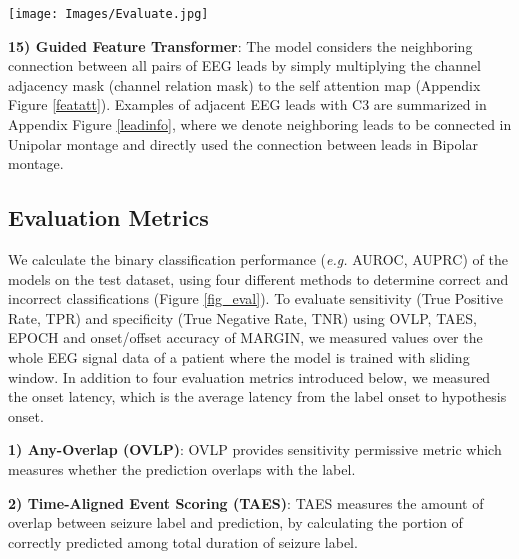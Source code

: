 \documentclass[pmlr,twocolumn,10pt]{jmlr}
\begin{document}
\begin{figure*}[h!]
	\centering
	\texttt{[image: Images/Evaluate.jpg]}
    \caption{\small \textbf{Evaluation Methods} on example raw EEG signal. OVLP, TAES, MARGIN evaluates the model on the whole raw signal. OVLP outputs whether the hypothesis overlaps with the label, and TAES outputs the duration of how much hypothesis overlaps with label. MARGIN evaluates whether the onset/offset of event hypothesis is within set margin window. EPOCH outputs evaluation on hypothesis based on each window. Then final TP is measured by counting the number of windows where the model hypothesis was correct, divided by the total number of windows within each batch. TP - True Positive; FN - False Negative.}
	\label{fig_eval}
	\vspace{-10pt}
\end{figure*} \noindent\textbf{15) Guided Feature Transformer}: The model considers the neighboring connection between all pairs of EEG leads by simply multiplying the channel adjacency mask (channel relation mask) to the self attention map (Appendix Figure \ref{featatt}).
Examples of adjacent EEG leads with C3 are summarized in Appendix Figure \ref{leadinfo}, where we denote neighboring leads to be connected in Unipolar montage and directly used the connection between leads in Bipolar montage.

\subsection{Evaluation Metrics}
\label{sec: evalmetric}
We calculate the binary classification performance (\textit{e.g.} AUROC, AUPRC) of the models on the test dataset, using four different methods to determine correct and incorrect classifications (Figure \ref{fig_eval}).
To evaluate sensitivity (True Positive Rate, TPR) and specificity (True Negative Rate, TNR) using OVLP, TAES, EPOCH and onset/offset accuracy of MARGIN, we measured values over the whole EEG signal data of a patient where the model is trained with sliding window. In addition to four evaluation metrics introduced below, we measured the onset latency, which is the average latency from the label onset to hypothesis onset. 



\noindent\textbf{1) Any-Overlap (OVLP)}: OVLP provides sensitivity permissive metric which measures whether the prediction overlaps with the label.

\noindent\textbf{2) Time-Aligned Event Scoring (TAES)}: TAES measures the amount of overlap between seizure label and prediction, by calculating the portion of correctly predicted among total duration of seizure label.
\end{document}
